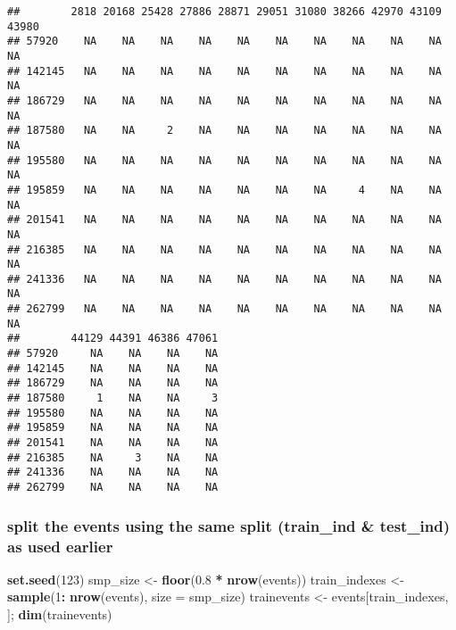 \documentclass[]{article}
\newenvironment{Shaded}{\begin{snugshade}}{\end{snugshade}}
\newcommand{\DataTypeTok}[1]{\textcolor[rgb]{0.13,0.29,0.53}{#1}}
\newcommand{\DecValTok}[1]{\textcolor[rgb]{0.00,0.00,0.81}{#1}}
\newcommand{\FloatTok}[1]{\textcolor[rgb]{0.00,0.00,0.81}{#1}}
\newcommand{\KeywordTok}[1]{\textcolor[rgb]{0.13,0.29,0.53}{\textbf{#1}}}
\newcommand{\NormalTok}[1]{#1}
\newcommand{\OperatorTok}[1]{\textcolor[rgb]{0.81,0.36,0.00}{\textbf{#1}}}
\newcommand{\StringTok}[1]{\textcolor[rgb]{0.31,0.60,0.02}{#1}}
\begin{document}
\begin{verbatim}
##        2818 20168 25428 27886 28871 29051 31080 38266 42970 43109 43980
## 57920    NA    NA    NA    NA    NA    NA    NA    NA    NA    NA    NA
## 142145   NA    NA    NA    NA    NA    NA    NA    NA    NA    NA    NA
## 186729   NA    NA    NA    NA    NA    NA    NA    NA    NA    NA    NA
## 187580   NA    NA     2    NA    NA    NA    NA    NA    NA    NA    NA
## 195580   NA    NA    NA    NA    NA    NA    NA    NA    NA    NA    NA
## 195859   NA    NA    NA    NA    NA    NA    NA     4    NA    NA    NA
## 201541   NA    NA    NA    NA    NA    NA    NA    NA    NA    NA    NA
## 216385   NA    NA    NA    NA    NA    NA    NA    NA    NA    NA    NA
## 241336   NA    NA    NA    NA    NA    NA    NA    NA    NA    NA    NA
## 262799   NA    NA    NA    NA    NA    NA    NA    NA    NA    NA    NA
##        44129 44391 46386 47061
## 57920     NA    NA    NA    NA
## 142145    NA    NA    NA    NA
## 186729    NA    NA    NA    NA
## 187580     1    NA    NA     3
## 195580    NA    NA    NA    NA
## 195859    NA    NA    NA    NA
## 201541    NA    NA    NA    NA
## 216385    NA     3    NA    NA
## 241336    NA    NA    NA    NA
## 262799    NA    NA    NA    NA
\end{verbatim}

\hypertarget{split-the-events-using-the-same-split-train_ind-test_ind-as-used-earlier}{%
\subsubsection{split the events using the same split (train\_ind \&
test\_ind) as used
earlier}\label{split-the-events-using-the-same-split-train_ind-test_ind-as-used-earlier}}

\begin{Shaded}
\begin{Highlighting}[]
\KeywordTok{set.seed}\NormalTok{(}\DecValTok{123}\NormalTok{)}
\NormalTok{smp_size <-}\StringTok{ }\KeywordTok{floor}\NormalTok{(}\FloatTok{0.8} \OperatorTok{*}\StringTok{ }\KeywordTok{nrow}\NormalTok{(events))}
\NormalTok{train_indexes <-}\StringTok{ }\KeywordTok{sample}\NormalTok{(}\DecValTok{1}\OperatorTok{:}\StringTok{ }\KeywordTok{nrow}\NormalTok{(events), }\DataTypeTok{size =}\NormalTok{ smp_size)}
\NormalTok{trainevents <-}\StringTok{ }\NormalTok{events[train_indexes, ]; }\KeywordTok{dim}\NormalTok{(trainevents)}
\end{Highlighting}
\end{Shaded}
\end{document}
